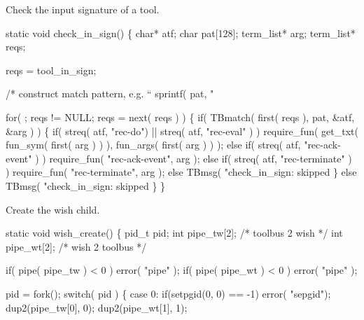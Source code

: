
Check the input signature of a tool.

\nwenddocs{}\endmoddef\let\nwnotused=\nwoutput{}\nwstartdeflinemarkup{}\nwenddeflinemarkup
static void check_in_sign()
\{
   char*      atf;
   char       pat[128];
   term_list* arg;
   term_list* reqs;

   reqs = tool_in_sign;
   
   /* construct match pattern, e.g. ``%
   sprintf( pat, "%

   for( ; reqs != NULL; reqs = next( reqs ) )
   \{
      if( TBmatch( first( reqs ), pat, &atf, &arg ) )
      \{
         if( streq( atf, "rec-do") || streq( atf, "rec-eval" ) )
            require_fun( get_txt( fun_sym( first( arg ) ) ), 
                         fun_args( first( arg ) ) );
         else
         if( streq( atf, "rec-ack-event" ) )
            require_fun( "rec-ack-event", arg );
         else
         if( streq( atf, "rec-terminate" ) )
            require_fun( "rec-terminate", arg );
         else
            TBmsg( "check_in_sign: skipped %
      \}
      else
         TBmsg( "check_in_sign: skipped %
   \}
\}
\nwendcode{}\nwdocspar



Create the wish child.

\nwenddocs{}\endmoddef\let\nwnotused=\nwoutput{}\nwstartdeflinemarkup{}\nwenddeflinemarkup
static void wish_create()
\{
   pid_t pid;
   int   pipe_tw[2]; /* toolbus 2 wish */
   int   pipe_wt[2]; /* wish 2 toolbus */
   
   if( pipe( pipe_tw ) < 0 )
      error( "pipe" );
   if( pipe( pipe_wt ) < 0 )
      error( "pipe" );

   pid = fork();
   switch( pid )
   \{
      case 0:
         if(setpgid(0, 0) == -1)
            error( "sepgid");
         dup2(pipe_tw[0], 0);
         dup2(pipe_wt[1], 1);
         
